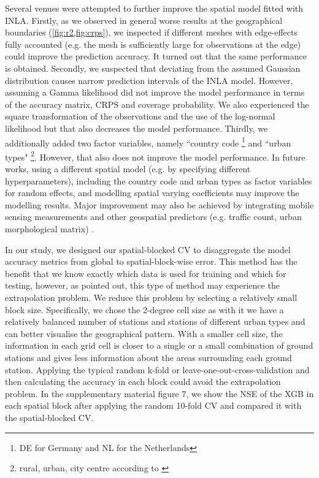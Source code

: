 \documentclass{article}
\begin{document}
Several venues were attempted to further improve the spatial model fitted with INLA. Firstly, as we observed in general worse results at the geographical boundaries (\cref{fig:r2,fig:crps}), we inspected if different meshes with edge-effects fully accounted (e.g. the mesh is sufficiently large for observations at the edge) could improve the prediction accuracy. It turned out that the same performance is obtained. Secondly, we suspected that deviating from the assumed Gaussian distribution causes narrow prediction intervals of the INLA model. However, assuming a Gamma likelihood did not improve the model performance in terms of the accuracy matrix, CRPS and coverage probability. We also experienced the square transformation of the observations and the use of the log-normal likelihood but that also decreases the model performance. Thirdly, we additionally added two factor variables, namely ``country code \footnote{DE for Germany and NL for the Netherlands} and ``urban types" \footnote{rural, urban, city centre according to \citep{urbantype}}. However, that also does not improve the model performance. In future works, using a different spatial model (e.g. by specifying different hyperparameters), including the country code and urban types as factor variables for random effects, and modelling spatial varying coefficients may improve the modelling results. Major improvement may also be achieved by integrating mobile sensing measurements and other geospatial predictors (e.g. traffic count, urban morphological matrix) \citep{moragaetal17}.

 

In our study, we designed our spatial-blocked CV to disaggregate the model accuracy metrics from global to spatial-block-wise error. This method has the benefit that we know exactly which data is used for training and which for testing, however, as \cite{wadoux2021spatial} pointed out, this type of method may experience the extrapolation problem. We reduce this problem by selecting a relatively small block size. Specifically, we chose the 2-degree cell size as with it we have a relatively balanced number of stations and stations of different urban types and can better visualise the geographical pattern. With a smaller cell size, the information in each grid cell is closer to a single or a small combination of ground stations and gives less information about the areas surrounding each ground station. Applying the typical random k-fold or leave-one-out-cross-validation and then calculating the accuracy in each block could avoid the extrapolation problem. In the supplementary material figure 7, we show the NSE of the XGB in each spatial block after applying the random 10-fold CV and compared it with the spatial-blocked CV. 
 
\end{document}
